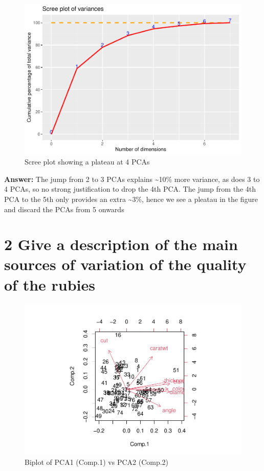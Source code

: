 \documentclass[
  8pt,
]{article}
\begin{document}
\begin{figure}

{\centering \includegraphics[width=0.65\linewidth,height=0.65\textheight]{Report_files/figure-latex/2.1-1} 

}

\caption{Scree plot showing a plateau at 4 PCAs}\label{fig:2.1}
\end{figure}

\textbf{Answer: } The jump from 2 to 3 PCAs explains \textasciitilde10\%
more variance, as does 3 to 4 PCAs, so no strong justification to drop
the 4th PCA. The jump from the 4th PCA to the 5th only provides an extra
\textasciitilde3\%, hence we see a pleatau in the figure and discard the
PCAs from 5 onwards

\hypertarget{give-a-description-of-the-main-sources-of-variation-of-the-quality-of-the-rubies}{%
\section{2 Give a description of the main sources of variation of the
quality of the
rubies}\label{give-a-description-of-the-main-sources-of-variation-of-the-quality-of-the-rubies}}

\begin{figure}

{\centering \includegraphics[width=0.65\linewidth,height=0.65\textheight]{Report_files/figure-latex/2.2-1} 

}

\caption{Biplot of PCA1 (Comp.1) vs PCA2 (Comp.2) }\label{fig:2.2}
\end{figure}
\end{document}
